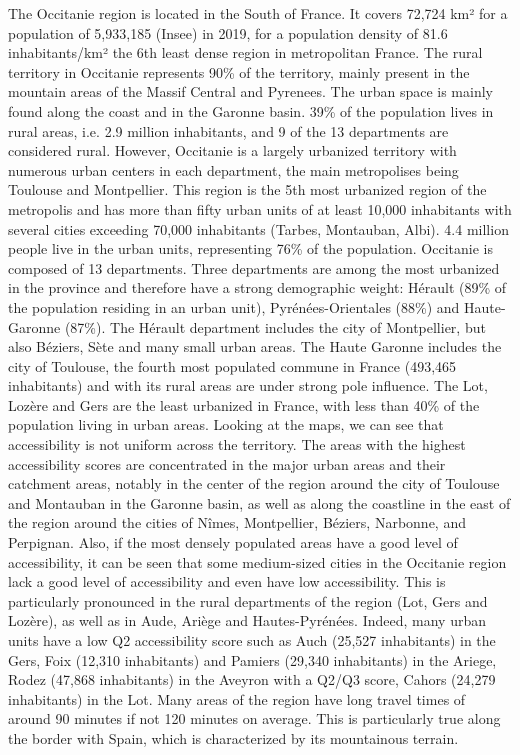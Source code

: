 The Occitanie region is located in the South of France. It covers 72,724 km² for a population of 5,933,185 (Insee) in 2019, for a population density of 81.6 inhabitants/km² the 6th least dense region in metropolitan France.
The rural territory in Occitanie represents 90\% of the territory, mainly present in the mountain areas of the Massif Central and Pyrenees. The urban space is mainly found along the coast and in the Garonne basin. 39\% of the population lives in rural areas, i.e. 2.9 million inhabitants, and 9 of the 13 departments are considered rural. However, Occitanie is a largely urbanized territory with numerous urban centers in each department, the main metropolises being Toulouse and Montpellier. This region is the 5th most urbanized region of the metropolis and has more than fifty urban units of at least 10,000 inhabitants with several cities exceeding 70,000 inhabitants (Tarbes, Montauban, Albi). 4.4 million people live in the urban units, representing 76\% of the population. Occitanie is composed of 13 departments. Three departments are among the most urbanized in the province and therefore have a strong demographic weight: Hérault (89\% of the population residing in an urban unit), Pyrénées-Orientales (88\%) and Haute-Garonne (87\%). The Hérault department includes the city of Montpellier, but also Béziers, Sète and many small urban areas. The Haute Garonne includes the city of Toulouse, the fourth most populated commune in France (493,465 inhabitants) and with its rural areas are under strong pole influence.  The Lot, Lozère and Gers are the least urbanized in France, with less than 40\% of the population living in urban areas. Looking at the maps, we can see that accessibility is not uniform across the territory. The areas with the highest accessibility scores are concentrated in the major urban areas and their catchment areas, notably in the center of the region around the city of Toulouse and Montauban in the Garonne basin, as well as along the coastline in the east of the region around the cities of Nîmes, Montpellier, Béziers, Narbonne, and Perpignan. Also, if the most densely populated areas have a good level of accessibility, it can be seen that some medium-sized cities in the Occitanie region lack a good level of accessibility and even have low accessibility. This is particularly pronounced in the rural departments of the region (Lot, Gers and Lozère), as well as in Aude, Ariège and Hautes-Pyrénées. Indeed, many urban units have a low Q2 accessibility score such as Auch (25,527 inhabitants) in the Gers, Foix (12,310 inhabitants) and Pamiers (29,340 inhabitants) in the Ariege, Rodez (47,868 inhabitants) in the Aveyron with a Q2/Q3 score, Cahors (24,279 inhabitants) in the Lot. Many areas of the region have long travel times of around 90 minutes if not 120 minutes on average. This is particularly true along the border with Spain, which is characterized by its mountainous terrain.


